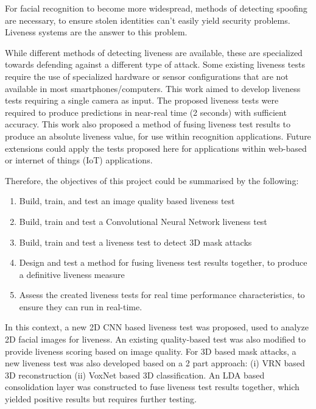 \documentclass[12pt,a4paper]{article}
\begin{document}
    For facial recognition to become more widespread, methods of detecting spoofing are necessary, to ensure stolen identities can't easily yield security problems. Liveness systems are the answer to this problem. 

    While different methods of detecting liveness are available, these are specialized towards defending against a different type of attack.
    Some existing liveness tests require the use of specialized hardware or sensor configurations that are not available in most smartphones/computers. 
    This work aimed to develop liveness tests requiring a single camera as input. The proposed liveness tests were required to produce predictions in near-real time (2 seconds) with sufficient accuracy.
    This work also proposed a method of fusing liveness test results to produce an absolute liveness value, for use within recognition applications.
    Future extensions could apply the tests proposed here for applications within web-based or internet of things (IoT) applications. 

    Therefore, the objectives of this project could be summarised by the following:

    \begin{center}
        \begin{enumerate}
            \item Build, train, and test an image quality based liveness test
            \item Build, train and test a Convolutional Neural Network liveness test
            \item Build, train and test a liveness test to detect 3D mask attacks
            \item Design and test a method for fusing liveness test results together, to produce a definitive liveness measure
            \item Assess the created liveness tests for real time performance characteristics, to ensure they can run in real-time.
        \end{enumerate}
    \end{center}

    In this context, a new 2D CNN based liveness test was proposed, used to analyze 2D facial images for liveness. An existing quality-based test was also modified to provide liveness scoring based on image quality. For 3D based mask attacks, a new liveness test was also developed based on a 2 part approach: (i) VRN based 3D reconstruction (ii) VoxNet based 3D classification.
    An LDA based consolidation layer was constructed to fuse liveness test results together, which yielded positive results but requires further testing.
\end{document}
